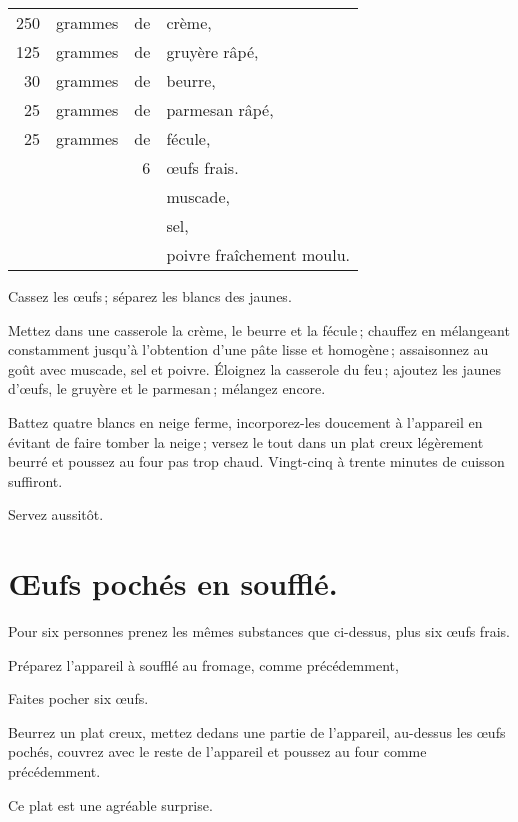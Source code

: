 \footnotesize
\begin{longtable}{rrrp{16em}}
  250 & grammes & de & crème,                                                                             \\
  125 & grammes & de & gruyère râpé,                                                                      \\
   30 & grammes & de & beurre,                                                                            \\
   25 & grammes & de & parmesan râpé,                                                                     \\
   25 & grammes & de & fécule,                                                                            \\
      &         &  6 & œufs frais.                                                                        \\
      &         &    & muscade,                                                                           \\
      &         &    & sel,                                                                               \\
      &         &    & poivre fraîchement moulu.                                                          \\
\end{longtable}
\normalsize

Cassez les œufs ; séparez les blancs des jaunes.

Mettez dans une casserole la crème, le beurre et la fécule ; chauffez en
mélangeant constamment jusqu'à l'obtention d'une pâte lisse et homogène ;
assaisonnez au goût avec muscade, sel et poivre. Éloignez la casserole du feu ;
ajoutez les jaunes d'œufs, le gruyère et le parmesan ; mélangez encore.

Battez quatre blancs en neige ferme, incorporez-les doucement à l'appareil en
évitant de faire tomber la neige ; versez le tout dans un plat creux légèrement
beurré et poussez au four pas trop chaud. Vingt-cinq à trente minutes de cuisson
suffiront.

Servez aussitôt.

\section*{\centering Œufs pochés en soufflé.}

Pour six personnes prenez les mêmes substances que ci-dessus, plus six œufs
frais.

Préparez l'appareil à soufflé au fromage, comme précédemment,

Faites pocher six œufs.

Beurrez un plat creux, mettez dedans une partie de l'appareil, au-dessus les
œufs pochés, couvrez avec le reste de l'appareil et poussez au four comme
précédemment.

Ce plat est une agréable surprise.

\sk
